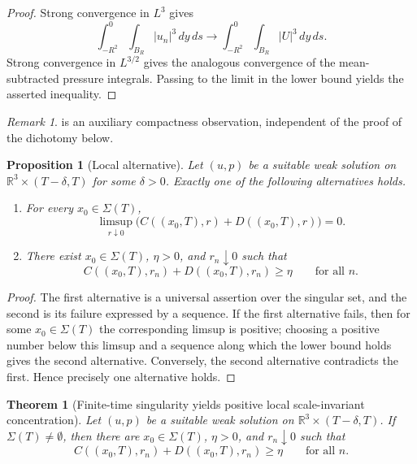 \documentclass[11pt]{amsart}
\theoremstyle{plain}
\newtheorem{theorem}{Theorem}[section]
\newtheorem{proposition}[proposition]{Proposition}
\theoremstyle{definition}
\theoremstyle{remark}
\newtheorem{remark}[remark]{Remark}
\numberwithin{equation}{section}
\begin{document}
\begin{proof}
Strong convergence in \(L^3\) gives
\[
  \int_{-R^2}^{0}\int_{B_R}|u_n|^3\,dy\,ds
  \longrightarrow
  \int_{-R^2}^{0}\int_{B_R}|U|^3\,dy\,ds.
\]
Strong convergence in \(L^{3/2}\) gives the analogous convergence of the
mean-subtracted pressure integrals.  Passing to the limit in the lower bound
yields the asserted inequality.
\end{proof}

\begin{remark}
 is an auxiliary compactness observation,
independent of the proof of the dichotomy below.
\end{remark}

\begin{proposition}[Local alternative]\label{p0:prop:local-alternative}
Let \((u,p)\) be a suitable weak solution on
\(\mathbb R^3\times(T-\delta,T)\) for some \(\delta>0\).  Exactly one of the
following alternatives holds.
\begin{enumerate}[label=\textup{(\roman*)}]
\item For every \(x_0\in\Sigma(T)\),
\[
  \limsup_{r\downarrow0}
  \bigl(C((x_0,T),r)+D((x_0,T),r)\bigr)=0.
\]
\item There exist \(x_0\in\Sigma(T)\), \(\eta>0\), and \(r_n\downarrow0\) such
that
\[
  C((x_0,T),r_n)+D((x_0,T),r_n)\ge\eta
  \qquad\text{for all }n.
\]
\end{enumerate}
\end{proposition}

\begin{proof}
The first alternative is a universal assertion over the singular set, and the
second is its failure expressed by a sequence.  If the first alternative fails,
then for some \(x_0\in\Sigma(T)\) the corresponding limsup is positive;
choosing a positive number below this limsup and a sequence along which the
lower bound holds gives the second alternative.  Conversely, the second
alternative contradicts the first.  Hence precisely one alternative holds.
\end{proof}

\begin{theorem}[Finite-time singularity yields positive local scale-invariant concentration]
\label{p0:thm:singular-positive}
Let \((u,p)\) be a suitable weak solution on
\(\mathbb R^3\times(T-\delta,T)\).  If \(\Sigma(T)\ne\emptyset\), then there
are \(x_0\in\Sigma(T)\), \(\eta>0\), and \(r_n\downarrow0\) such that
\[
  C((x_0,T),r_n)+D((x_0,T),r_n)\ge\eta
  \qquad\text{for all }n.
\]
\end{theorem}
\end{document}
